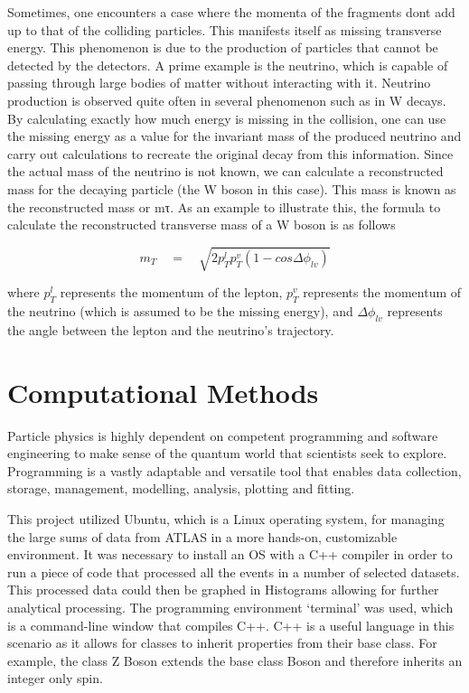 \documentclass[runningheads,a4paper]{llncs}
\begin{document}
Sometimes, one encounters a case where the momenta of the fragments dont add up to that of the colliding particles. This manifests itself as missing transverse energy. This phenomenon is due to the production of particles that cannot be detected by the detectors. A prime example is the neutrino, which is capable of passing through large bodies of matter without interacting with it. Neutrino production is observed quite often in several phenomenon such as in W decays. By calculating exactly how much energy is missing in the collision, one can use the missing energy as a value for the invariant mass of the produced neutrino and carry out calculations to recreate the original decay from this information. Since the actual mass of the neutrino is not known, we can calculate a reconstructed mass for the decaying particle (the W boson in this case). This mass is known as the reconstructed mass or mτ. As an example to illustrate this, the formula \cite{http://physics.stackexchange.com_13ADAD} to calculate the reconstructed transverse mass of a W boson is as follows 

\begin{equation}
{ m }_{ T }\quad =\quad \sqrt { 2{ p }_{ T }^{ l }{ p }_{ T }^{ v }(1-cos\Delta { \phi  }_{ lv }) }
\end{equation}
 
where ${ p }_{ T }^{ l }$ represents the momentum of the lepton, ${ p }_{ T }^{ v }$ represents the momentum of the neutrino (which is assumed to be the missing energy), and $\Delta { \phi  }_{ lv }$ represents the angle between the lepton and the neutrino’s trajectory. 



\section{Computational Methods}

Particle physics is highly dependent on competent programming and software engineering to make sense of the quantum world that scientists seek to explore. Programming is a vastly adaptable and versatile tool that enables data collection, storage, management, modelling, analysis, plotting and fitting.

This project utilized Ubuntu, which is a Linux operating system, for managing the large sums of data from ATLAS in a more hands-on, customizable environment. It was necessary to install an OS with a C++ compiler in order to run a piece of code that processed all the events in a number of selected datasets. This processed data could then be graphed in Histograms allowing for further analytical processing. The programming environment ‘terminal’ was used, which is a command-line window that compiles C++. C++ is a useful language in this scenario as it allows for classes to inherit properties from their base class. For example, the class Z Boson extends the base class Boson and therefore inherits an integer only spin.
\end{document}
